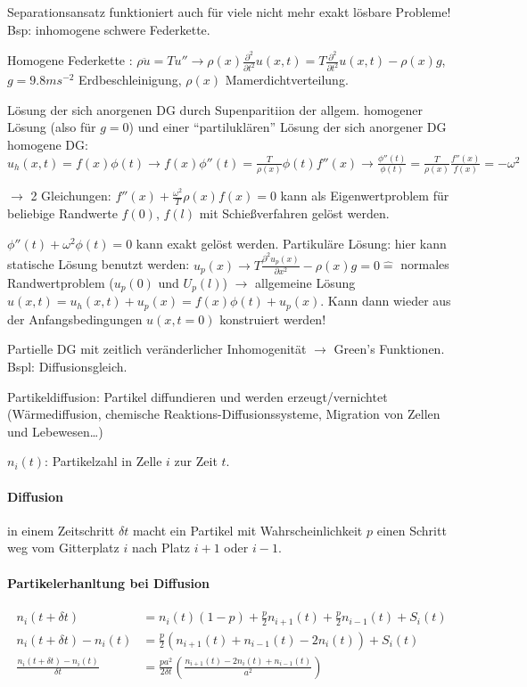 \documentclass[a4paper,ngerman]{scrbook}
\begin{document}
Separationsansatz funktioniert auch für viele nicht mehr exakt lösbare Probleme! Bsp: inhomogene schwere Federkette.

Homogene Federkette : $\rho \ddot{u} = T u'' \to \rho(x) \frac{\partial^2}{\partial t^2} u(x,t) = T \frac{\partial^2}{\partial t^2} u(x,t) - \rho(x) g$, $g = 9.8\si{ms^{-2}}$ Erdbeschleinigung, $\rho(x)$ Mamerdichtverteilung.

Lösung der sich anorgenen DG durch Supenparitiion der allgem. homogener Lösung (also für $g=0$) und einer "`partiluklären"' Lösung der sich anorgener DG homogene DG: $u_h(x,t) = f(x) \phi(t) \to f(x)\phi''(t) = \frac{T}{\rho(x)}\phi(t) f''(x) \to \frac{\phi''(t)}{\phi(t)} = \frac{T}{\rho(x)}\frac{f''(x)}{f(x)} = -\omega^2$

$\to$ 2 Gleichungen: $f''(x) + \frac{\omega^2}{T} \rho(x)f(x) = 0$ kann als Eigenwertproblem für beliebige Randwerte $f(0)$, $f(l)$ mit Schießverfahren gelöst werden.

$\phi''(t) + \omega^2 \phi(t) = 0$ kann exakt gelöst werden. Partikuläre Lösung: hier kann statische Lösung benutzt werden: $u_p(x) \to T\frac{\partial^2 u_p(x)}{\partial x^2} -\rho(x)g = 0 \hat{=}$ normales Randwertproblem ($u_p(0)$ und $U_p(l)$) $\to$ allgemeine Lösung $u(x,t) = u_h(x,t) + u_p(x) = f(x)\phi(t) + u_p(x)$. Kann dann wieder aus der Anfangsbedingungen $u(x,t=0)$ konstruiert werden!

Partielle DG mit zeitlich veränderlicher Inhomogenität $\to$ Green's Funktionen. Bspl: Diffusionsgleich.

Partikeldiffusion: Partikel diffundieren und werden erzeugt/vernichtet (Wärmediffusion, chemische Reaktions-Diffusionssysteme, Migration von Zellen und Lebewesen\dots)

$n_i(t)$: Partikelzahl in Zelle $i$ zur Zeit $t$.

\paragraph{Diffusion}

in einem Zeitschritt $\delta t$ macht ein Partikel mit Wahrscheinlichkeit $p$ einen Schritt weg vom Gitterplatz $i$ nach Platz $i+1$ oder $i-1$.

\paragraph{Partikelerhanltung bei Diffusion}

\begin{align*}
  n_i(t + \delta t) &= n_i(t) (1-p) + \frac{p}{2} n_{i+1}(t) +   \frac{p}{2} n_{i-1}(t) + S_i(t)\\
n_i(t + \delta t) - n_i(t) &= \frac{p}{2} \left( n_{i+1}(t) + n_{i-1}(t) -2n_i(t)\right) + S_i(t)\\
\frac{n_i(t + \delta t) - n_i(t)}{\delta t} &= \frac{pa^2}{2\delta t} \left( \frac{n_{i+1}(t) -2n_i(t) + n_{i-1}(t)}{a^2} \right)
\end{align*}
\end{document}
